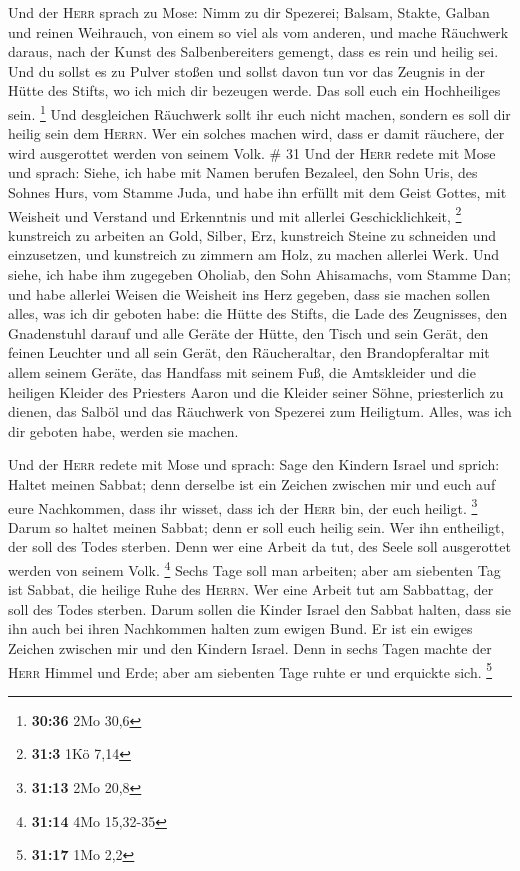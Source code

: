  Und der \textsc{Herr} sprach zu Mose: Nimm zu dir
Spezerei; Balsam, Stakte, Galban und reinen Weihrauch, von einem so viel
als vom anderen,  und mache Räuchwerk daraus, nach der
Kunst des Salbenbereiters gemengt, dass es rein und heilig sei.
 Und du sollst es zu Pulver stoßen und sollst davon tun
vor das Zeugnis in der Hütte des Stifts, wo ich mich dir bezeugen werde.
Das soll euch ein Hochheiliges sein. \footnote{\textbf{30:36} 2Mo 30,6}
 Und desgleichen Räuchwerk sollt ihr euch nicht machen,
sondern es soll dir heilig sein dem \textsc{Herrn}.  Wer
ein solches machen wird, dass er damit räuchere, der wird ausgerottet
werden von seinem Volk. \# 31  Und der \textsc{Herr}
redete mit Mose und sprach:  Siehe, ich habe mit Namen
berufen Bezaleel, den Sohn Uris, des Sohnes Hurs, vom Stamme Juda,
 und habe ihn erfüllt mit dem Geist Gottes, mit Weisheit
und Verstand und Erkenntnis und mit allerlei Geschicklichkeit,
\footnote{\textbf{31:3} 1Kö 7,14}  kunstreich zu arbeiten
an Gold, Silber, Erz,  kunstreich Steine zu schneiden und
einzusetzen, und kunstreich zu zimmern am Holz, zu machen allerlei Werk.
 Und siehe, ich habe ihm zugegeben Oholiab, den Sohn
Ahisamachs, vom Stamme Dan; und habe allerlei Weisen die Weisheit ins
Herz gegeben, dass sie machen sollen alles, was ich dir geboten habe:
 die Hütte des Stifts, die Lade des Zeugnisses, den
Gnadenstuhl darauf und alle Geräte der Hütte,  den Tisch
und sein Gerät, den feinen Leuchter und all sein Gerät, den
Räucheraltar,  den Brandopferaltar mit allem seinem
Geräte, das Handfass mit seinem Fuß,  die Amtskleider und
die heiligen Kleider des Priesters Aaron und die Kleider seiner Söhne,
priesterlich zu dienen,  das Salböl und das Räuchwerk von
Spezerei zum Heiligtum. Alles, was ich dir geboten habe, werden sie
machen.

 Und der \textsc{Herr} redete mit Mose und sprach:
 Sage den Kindern Israel und sprich: Haltet meinen
Sabbat; denn derselbe ist ein Zeichen zwischen mir und euch auf eure
Nachkommen, dass ihr wisset, dass ich der \textsc{Herr} bin, der euch
heiligt. \footnote{\textbf{31:13} 2Mo 20,8}  Darum so
haltet meinen Sabbat; denn er soll euch heilig sein. Wer ihn entheiligt,
der soll des Todes sterben. Denn wer eine Arbeit da tut, des Seele soll
ausgerottet werden von seinem Volk. \footnote{\textbf{31:14} 4Mo
  15,32-35}  Sechs Tage soll man arbeiten; aber am
siebenten Tag ist Sabbat, die heilige Ruhe des \textsc{Herrn}. Wer eine
Arbeit tut am Sabbattag, der soll des Todes sterben. 
Darum sollen die Kinder Israel den Sabbat halten, dass sie ihn auch bei
ihren Nachkommen halten zum ewigen Bund.  Er ist ein
ewiges Zeichen zwischen mir und den Kindern Israel. Denn in sechs Tagen
machte der \textsc{Herr} Himmel und Erde; aber am siebenten Tage ruhte
er und erquickte sich. \footnote{\textbf{31:17} 1Mo 2,2}

